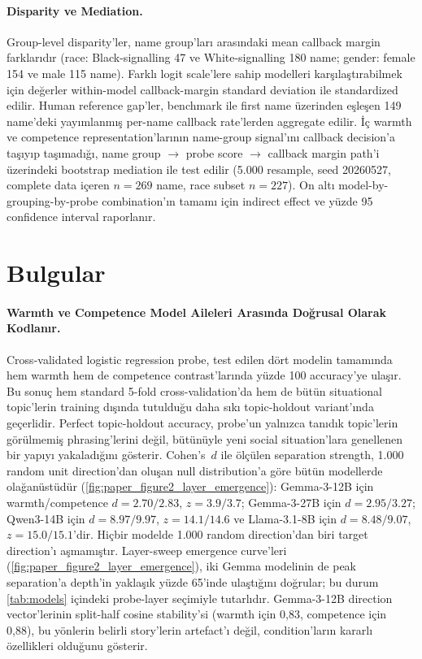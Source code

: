 \documentclass[twocolumn]{article}
\begin{document}
\paragraph{Disparity ve Mediation.}
Group-level disparity'ler, name group'ları arasındaki mean callback margin
farklarıdır (race: Black-signalling 47 ve White-signalling 180 name; gender:
female 154 ve male 115 name). Farklı logit scale'lere sahip modelleri
karşılaştırabilmek için değerler within-model callback-margin standard deviation
ile standardized edilir. Human reference gap'ler, benchmark ile first name
üzerinden eşleşen 149 name'deki yayımlanmış per-name callback rate'lerden
aggregate edilir. İç warmth ve competence representation'larının name-group
signal'ını callback decision'a taşıyıp taşımadığı, name group $\to$ probe score
$\to$ callback margin path'i üzerindeki bootstrap mediation ile test edilir
(5.000 resample, seed 20260527, complete data içeren $n = 269$ name, race subset
$n = 227$). On altı model-by-grouping-by-probe combination'ın tamamı için
indirect effect ve yüzde 95 confidence interval raporlanır.

\section*{Bulgular}

\paragraph{Warmth ve Competence Model Aileleri Arasında Doğrusal Olarak Kodlanır.}
Cross-validated logistic regression probe, test edilen dört modelin tamamında
hem warmth hem de competence contrast'larında yüzde 100 accuracy'ye ulaşır. Bu
sonuç hem standard 5-fold cross-validation'da hem de bütün situational
topic'lerin training dışında tutulduğu daha sıkı topic-holdout variant'ında
geçerlidir. Perfect topic-holdout accuracy, probe'un yalnızca tanıdık
topic'lerin görülmemiş phrasing'lerini değil, bütünüyle yeni social situation'lara
genellenen bir yapıyı yakaladığını gösterir. Cohen's~$d$ ile ölçülen separation
strength, 1.000 random unit direction'dan oluşan null distribution'a göre bütün
modellerde olağanüstüdür (\autoref{fig:paper_figure2_layer_emergence}):
Gemma-3-12B için warmth/competence $d = 2.70/2.83$, $z = 3.9/3.7$;
Gemma-3-27B için $d = 2.95/3.27$; Qwen3-14B için $d = 8.97/9.97$,
$z = 14.1/14.6$ ve Llama-3.1-8B için $d = 8.48/9.07$,
$z = 15.0/15.1$'dir. Hiçbir modelde 1.000 random direction'dan biri target
direction'ı aşmamıştır. Layer-sweep emergence curve'leri
(\autoref{fig:paper_figure2_layer_emergence}), iki Gemma modelinin de peak
separation'a depth'in yaklaşık yüzde 65'inde ulaştığını doğrular; bu durum
\autoref{tab:models} içindeki probe-layer seçimiyle tutarlıdır. Gemma-3-12B
direction vector'lerinin split-half cosine stability'si (warmth için 0,83,
competence için 0,88), bu yönlerin belirli story'lerin artefact'ı değil,
condition'ların kararlı özellikleri olduğunu gösterir.
\end{document}
